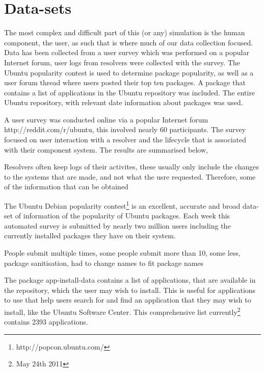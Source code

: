 \section{Data-sets}
The most complex and difficult part of this (or any) simulation is the human component, the user,
as such that is where much of our data collection focused.
Data has been collected from
a user survey which was performed on a popular Internet forum,
user logs from resolvers were collected with the survey.
The Ubuntu popularity contest is used to determine package popularity,
as well as a user forum thread where users posted their top ten packages.
A package that contains a list of applications in the Ubuntu repository was included.
The entire Ubuntu repository, with relevant date information about packages was used.

A user survey was conducted online via a popular Internet forum http://reddit.com/r/ubuntu, this involved nearly 60 participants. %
The survey focused on user interaction with a resolver and the lifecycle that is associated with their component system.
The results are summarised below, %

Resolvers often keep logs of their activites, these usually only include the changes to the systems that are made, and not what the usre requested.
Therefore, some of the information that can be obtained

The Ubuntu Debian popularity contest\footnote{http://popcon.ubuntu.com/} is an excellent, accurate and broad data-set of information of the popularity of Ubuntu packages.
Each week this automated survey is submitted by nearly two million users including the currently installed packages they have on their system.

People submit multiple times, some people submit more than 10, some less, package sanitisation, had to change names to fit package names

The package app-install-data contains a list of applications, that are available in the repository, which the user may wish to install.
This is useful for applications to use that help users search for and find an application that they may wish to install, like the Ubuntu Software Center.
This comprehensive list currently\footnote{May 24th 2011} contains 2393 applications.

